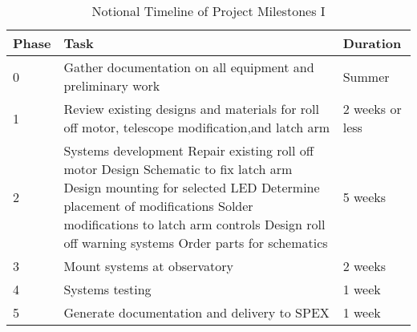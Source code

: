 \documentclass[conference]{IEEEtran} %
\begin{document}
\begin{table}[hb!]
      \caption{Notional Timeline of Project Milestones I}
      \centering
      \begin{tabularx}{\linewidth}{lXl}
          \toprule %
          Phase & Task & Duration \\
          \midrule %
          0 & Gather documentation on all equipment and preliminary work & Summer \\
          1 & Review existing designs and materials for roll off motor, telescope modification,and latch arm & 2 weeks or less \\
          2 & Systems development
          Repair existing roll off motor
          Design Schematic to fix latch arm
          Design mounting for selected LED
          Determine placement of modifications
          Solder modifications to latch arm controls
          Design roll off warning systems
          Order parts for schematics & 5 weeks \\
          3 & Mount systems at observatory & 2 weeks \\
          4 & Systems testing & 1 week \\
          5 & Generate documentation and delivery to SPEX & 1 week \\
          \bottomrule
      \end{tabularx}
  \label{tab:timeline1}
  \end{table}
\end{document}
